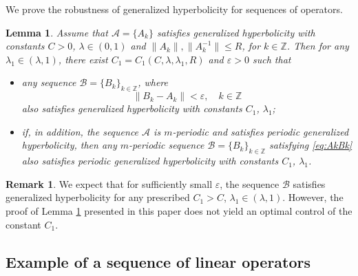 \documentclass[12pt]{article}
\newcommand{\Zz}{\mathbb{Z}}
\newtheorem{lem}[thm]{Lemma}
\theoremstyle{definition}
\newtheorem{remark}[thm]{Remark}
\begin{document}
We prove the robustness of generalized hyperbolicity for sequences of operators.
\begin{lem}\label{lem:CL-robust-Ak}
Assume that $\mathcal{A}=\{A_k\}$ satisfies generalized hyperbolicity
with constants $C>0$, $\lambda\in(0,1)$ and $\|A_k\|,\|A_k^{-1}\|\leq R$, for $k\in\Zz$. 
Then for any $\lambda_1 \in (\lambda, 1)$, there exist $C_1 = C_1(C, \lambda, \lambda_1, R)$ and $\varepsilon > 0$ such that 
    \begin{itemize}
        \item[(Robust1)]  any sequence $\mathcal{B} = \{B_k\}_{k \in \Zz}$, where 
\begin{equation}\label{eq:AkBk}
        \|B_k - A_k\| < \varepsilon, \quad k \in \Zz  
\end{equation}
        also satisfies generalized hyperbolicity with constants $C_1$, $\lambda_1$;
        \item [(Robust2)] if, in addition, the sequence $\mathcal{A}$ is $m$-periodic and satisfies periodic generalized hyperbolicity, then any $m$-periodic sequence $\mathcal{B} = \{B_k\}_{k \in \Zz}$ satisfying \eqref{eq:AkBk} also satisfies periodic generalized hyperbolicity with constants $C_1$, $\lambda_1$.
    \end{itemize}
\end{lem}
\begin{remark}
We expect that for sufficiently small $\varepsilon$, the sequence $\mathcal{B}$ satisfies generalized hyperbolicity for any prescribed $C_1 > C$, $\lambda_1 \in (\lambda, 1)$. However, the proof of Lemma \ref{lem:CL-robust-Ak} presented in this paper does not yield an optimal control of the constant $C_1$.
\end{remark}


\subsection{Example of a sequence of linear operators}\label{sec:cl-not-ed}
\end{document}
